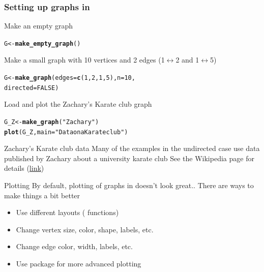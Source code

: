 \documentclass[aspectratio=169]{beamer}\usepackage[]{graphicx}\usepackage[]{xcolor}
\makeatletter
\newcommand{\hlnum}[1]{\textcolor[rgb]{0.686,0.059,0.569}{#1}}%
\newcommand{\hlsng}[1]{\textcolor[rgb]{0.192,0.494,0.8}{#1}}%
\newcommand{\hldef}[1]{\textcolor[rgb]{0.345,0.345,0.345}{#1}}%
\newcommand{\hlkwb}[1]{\textcolor[rgb]{0.69,0.353,0.396}{#1}}%
\newcommand{\hlkwc}[1]{\textcolor[rgb]{0.333,0.667,0.333}{#1}}%
\newcommand{\hlkwd}[1]{\textcolor[rgb]{0.737,0.353,0.396}{\textbf{#1}}}%
\newenvironment{kframe}{%
 \def\at@end@of@kframe{}%
 \ifinner\ifhmode%
  \def\at@end@of@kframe{\end{minipage}}%
  \begin{minipage}{\columnwidth}%
 \fi\fi%
 \def\FrameCommand##1{\hskip\@totalleftmargin \hskip-\fboxsep
 \colorbox{shadecolor}{##1}\hskip-\fboxsep
     \hskip-\linewidth \hskip-\@totalleftmargin \hskip\columnwidth}%
 \MakeFramed {\advance\hsize-\width
   \@totalleftmargin\z@ \linewidth\hsize
   \@setminipage}}%
 {\par\unskip\endMakeFramed%
 \at@end@of@kframe}
\newenvironment{knitrout}{}{} %
\makeatother
\begin{document}
\begin{frame}[fragile]\frametitle{Setting up graphs in }
Make an empty graph
\begin{knitrout}
\color{fgcolor}\begin{kframe}
\begin{alltt}
\hldef{G} \hlkwb{<-} \hlkwd{make_empty_graph}\hldef{()}
\end{alltt}
\end{kframe}
\end{knitrout}
\vfill
Make a small graph with 10 vertices and 2 edges (1$\leftrightarrow$2 and 1$\leftrightarrow$5)
\begin{knitrout}
\color{fgcolor}\begin{kframe}
\begin{alltt}
\hldef{G} \hlkwb{<-} \hlkwd{make_graph}\hldef{(}\hlkwc{edges} \hldef{=} \hlkwd{c}\hldef{(}\hlnum{1}\hldef{,} \hlnum{2}\hldef{,} \hlnum{1}\hldef{,} \hlnum{5}\hldef{),} \hlkwc{n} \hldef{=} \hlnum{10}\hldef{,}
                \hlkwc{directed} \hldef{=} \hlnum{FALSE}\hldef{)}
\end{alltt}
\end{kframe}
\end{knitrout}
\vfill
Load and plot the Zachary's Karate club graph
\begin{knitrout}
\color{fgcolor}\begin{kframe}
\begin{alltt}
\hldef{G_Z} \hlkwb{<-} \hlkwd{make_graph}\hldef{(}\hlsng{"Zachary"}\hldef{)}
\hlkwd{plot}\hldef{(G_Z,} \hlkwc{main} \hldef{=} \hlsng{"Data on a Karate club"}\hldef{)}
\end{alltt}
\end{kframe}
\end{knitrout}
\end{frame}


\begin{frame}{Zachary's Karate club data}
Many of the  examples in the undirected case use data published by Zachary about a university karate club
\vfill
See the Wikipedia page for details (\href{https://en.wikipedia.org/wiki/Zachary's_karate_club}{link})
\end{frame}

\begin{frame}{Plotting}
By default, plotting of graphs in  doesn't look great.. There are ways to make things a bit better
\vfill
\begin{itemize}
\item Use different layouts ( functions)
\item Change vertex size, color, shape, labels, etc.
\item Change edge color, width, labels, etc.
\item Use  package for more advanced plotting
\end{itemize}
\end{frame}
\end{document}

